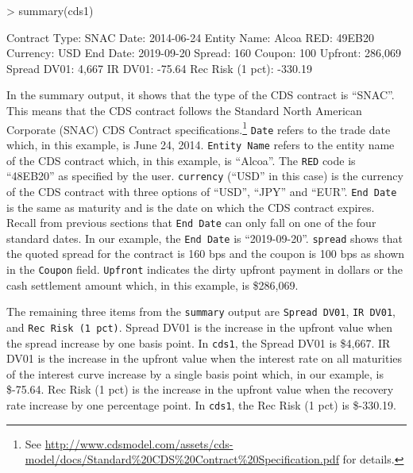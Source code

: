 \documentclass{jss}
\begin{document}
\begin{Schunk}
\begin{Sinput}
> summary(cds1)
\end{Sinput}
\begin{Soutput}
Contract Type:                      SNAC   Date:                      2014-06-24
Entity Name:                       Alcoa   RED:                           49EB20
Currency:                            USD   End Date:                  2019-09-20
Spread:                              160   Coupon:                           100
Upfront:                         286,069   Spread DV01:                    4,667
IR DV01:                          -75.64   Rec Risk (1 pct):             -330.19
\end{Soutput}
\end{Schunk}

In the summary output, it shows that the type of the CDS contract is ``SNAC''. This means that the CDS contract follows the Standard North American Corporate (SNAC) CDS Contract specifications.\footnote{See \url{http://www.cdsmodel.com/assets/cds-model/docs/Standard\%20CDS\%20Contract\%20Specification.pdf} for details.}  \texttt{Date} refers to the trade date which, in this example, is June 24, 2014. \texttt{Entity Name} refers to the entity name of the CDS contract which, in this example, is ``Alcoa''. The \texttt{RED} code is ``48EB20'' as specified by the user. \texttt{currency} (``USD'' in this case) is the currency of the CDS contract with three options of ``USD'', ``JPY'' and ``EUR''. \texttt{End Date} is the same as maturity and is the date on which the CDS contract expires. Recall from previous sections that \texttt{End Date} can only fall on one of the four standard dates. In our example, the \texttt{End Date} is ``2019-09-20''. \texttt{spread} shows that the quoted spread for the contract is 160 bps and the coupon is 100 bps as shown in the \texttt{Coupon} field. \texttt{Upfront} indicates the dirty upfront payment in dollars or the cash settlement amount which, in this example, is \$286,069.

The remaining three items from the \texttt{summary} output  are \texttt{Spread DV01}, \texttt{IR DV01}, and \texttt{Rec Risk (1 pct)}. Spread DV01 is the increase in the upfront value when the spread increase by one basis point. In \texttt{cds1}, the Spread DV01 is \$4,667. IR DV01 is the increase in the upfront value when the interest rate on all maturities of the interest curve increase by a single basis point which, in our example, is \$-75.64. Rec Risk (1 pct) is the increase in the upfront value when the recovery rate increase by one percentage point. In \texttt{cds1}, the Rec Risk (1 pct) is \$-330.19.
\end{document}

